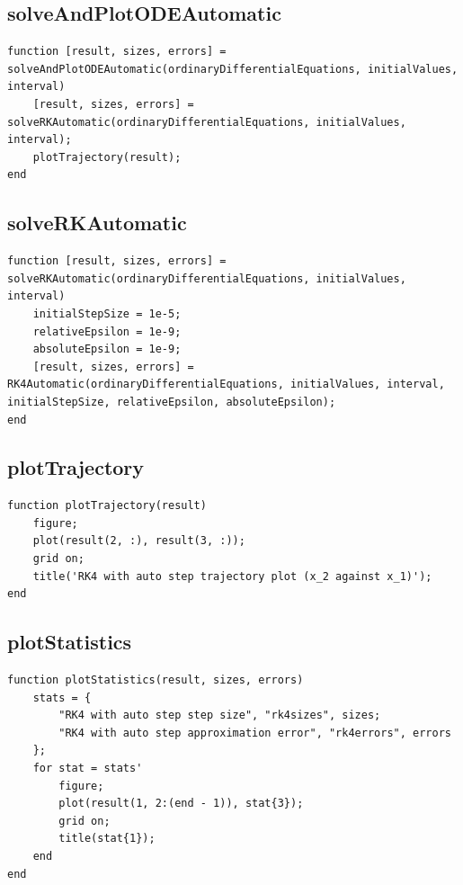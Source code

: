 \subsection{solveAndPlotODEAutomatic}
\begin{simplechar}
\begin{lstlisting}
function [result, sizes, errors] = solveAndPlotODEAutomatic(ordinaryDifferentialEquations, initialValues, interval)
    [result, sizes, errors] = solveRKAutomatic(ordinaryDifferentialEquations, initialValues, interval);
    plotTrajectory(result);
end
\end{lstlisting}
\end{simplechar}

\subsection{solveRKAutomatic}
\begin{simplechar}
\begin{lstlisting}
function [result, sizes, errors] = solveRKAutomatic(ordinaryDifferentialEquations, initialValues, interval)
    initialStepSize = 1e-5;
    relativeEpsilon = 1e-9;
    absoluteEpsilon = 1e-9;
    [result, sizes, errors] = RK4Automatic(ordinaryDifferentialEquations, initialValues, interval, initialStepSize, relativeEpsilon, absoluteEpsilon);
end
\end{lstlisting}
\end{simplechar}

\subsection{plotTrajectory}
\begin{simplechar}
\begin{lstlisting}
function plotTrajectory(result)
    figure;
    plot(result(2, :), result(3, :));
    grid on;
    title('RK4 with auto step trajectory plot (x_2 against x_1)');
end
\end{lstlisting}
\end{simplechar}

\subsection{plotStatistics}
\begin{simplechar}
\begin{lstlisting}
function plotStatistics(result, sizes, errors)
    stats = {
        "RK4 with auto step step size", "rk4sizes", sizes;
        "RK4 with auto step approximation error", "rk4errors", errors
    };
    for stat = stats'
        figure;
        plot(result(1, 2:(end - 1)), stat{3});
        grid on;
        title(stat{1});
    end
end
\end{lstlisting}
\end{simplechar}

